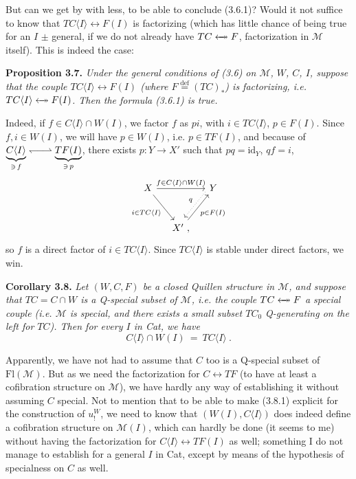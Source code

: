 \documentclass[11pt]{article}
\newcommand{\msp}[1]{\marginpar{\footnotesize [#1]}}
\newcommand{\M}{\mathcal{M}}
\newcommand{\Fl}{\mathrm{Fl}}
\newcommand{\id}{\mathrm{id}}
\newcommand{\deq}{\overset{\text{def}}{=}}
\newcommand{\fact}{\mathrel{\leftarrow\mkern-11mu\twoheadrightarrow}}
\newcommand{\harp}{\mathrel{\leftharpoondown\joinrel\relbar\joinrel\rightharpoonup}}
\begin{document}
But can we get by with less, to be able to conclude (3.6.1)? Would it not suffice to know that $TC\langle I\rangle\longleftrightarrow F(I)$ is factorizing (which has little chance of being true for an $I$ $\pm$ general, if we do not already have $TC\fact F$, factorization in $\M$ itself). This is indeed the case:

\msp{page 41}
\textbf{Proposition 3.7.} \textit{Under the general conditions of \textup{(3.6)} on $\M$, $W$, $C$, $I$, suppose that the couple $TC\langle I\rangle\longleftrightarrow F(I)$ (where $F\deq (TC)_*$) is factorizing, i.e. $TC\langle I\rangle\fact F(I)$. Then the formula \textup{(3.6.1)} is true.}

Indeed, if $f\in C\langle I\rangle\cap W(I)$, we factor $f$ as $pi$, with $i\in TC\langle I\rangle$, $p\in F(I)$. Since $f,i\in W(I)$, we will have $p\in W(I)$, i.e. $p\in TF(I)$, and because of $\underbrace{C\langle I\rangle}_{\ni\, f}\harp\underbrace{TF(I)}_{\ni\, p}$, there exists $p : Y\longrightarrow X'$ such that $pq=\id_Y$, $qf=i$, %
\[
\begin{tikzcd}[column sep=small, row sep=large]
X \arrow[rr, "f\in C\langle I\rangle\cap W(I)"] \arrow[dr, "i\in TC\langle I\rangle"'] & & Y \arrow[dl, dotted, shift right=1ex, "q"'] \\
& X' \arrow[ur, "p\in F(I)"'] \ , &
\end{tikzcd}
\]
so $f$ is a direct factor of $i\in TC\langle I\rangle$. Since $TC\langle I\rangle$ is stable under direct factors, we win.

\textbf{Corollary 3.8.} \textit{Let $(W,C,F)$ be a closed Quillen structure in $\M$, and suppose that $TC=C\cap W$ is a Q-special subset of $\M$, i.e. the couple $TC\fact F$ a special couple (i.e. $\M$ is \textup{special}, and there exists a small subset $TC_0$ Q-generating on the left for $TC$). Then for every $I$ in \textup{Cat}, we have}
\[
C\langle I\rangle\cap W(I) \ = \ TC\langle I\rangle \ . \tag*{(3.8.1)}
\]

\msp{page 42}
Apparently, we have not had to assume that $C$ too is a Q-special subset of $\Fl(\M)$. But as we need the factorization for $C\longleftrightarrow TF$ (to have at least a cofibration structure on $\M$), we have hardly any way of establishing it without assuming $C$ special. Not to mention that to be able to make (3.8.1) explicit for the construction of $u^{W}_{!}$, we need to know that $(W(I),C\langle I\rangle)$ does indeed define a cofibration structure on $\M(I)$, which can hardly be done (it seems to me) without having the factorization for $C\langle I\rangle\longleftrightarrow TF(I)$ as well; something I do not manage to establish for a general $I$ in Cat, except by means of the hypothesis of specialness on $C$ as well.
\end{document}
